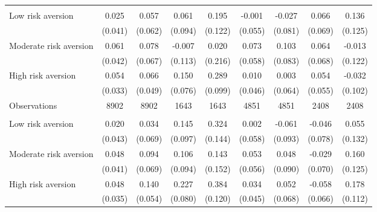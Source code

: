 {\begin{tabular}{l*{8}{c}}
\midrule
\addlinespace
\multicolumn{9}{l}{\textit{Panel B: Goods index}} \\
\addlinespace
Low risk aversion&    0.025         &    0.057         &    0.061         &    0.195         &   -0.001         &   -0.027         &    0.066         &    0.136         \\
                &  (0.041)         &  (0.062)         &  (0.094)         &  (0.122)         &  (0.055)         &  (0.081)         &  (0.069)         &  (0.125)         \\
\addlinespace
Moderate risk aversion&    0.061         &    0.078         &   -0.007         &    0.020         &    0.073         &    0.103         &    0.064         &   -0.013         \\
                &  (0.042)         &  (0.067)         &  (0.113)         &  (0.216)         &  (0.058)         &  (0.083)         &  (0.068)         &  (0.122)         \\
\addlinespace
High risk aversion&    0.054         &    0.066         &    0.150\sym{**} &    0.289\sym{***}&    0.010         &    0.003         &    0.054         &   -0.032         \\
                &  (0.033)         &  (0.049)         &  (0.076)         &  (0.099)         &  (0.046)         &  (0.064)         &  (0.055)         &  (0.102)         \\

\midrule
Observations    &     8902         &     8902         &     1643         &     1643         &     4851         &     4851         &     2408         &     2408         \\



\midrule
\addlinespace
\multicolumn{9}{l}{\textit{Panel C: Time index}} \\
\addlinespace
Low risk aversion&    0.020         &    0.034         &    0.145         &    0.324\sym{**} &    0.002         &   -0.061         &   -0.046         &    0.055         \\
                &  (0.043)         &  (0.069)         &  (0.097)         &  (0.144)         &  (0.058)         &  (0.093)         &  (0.078)         &  (0.132)         \\
\addlinespace
Moderate risk aversion&    0.048         &    0.094         &    0.106         &    0.143         &    0.053         &    0.048         &   -0.029         &    0.160         \\
                &  (0.041)         &  (0.069)         &  (0.094)         &  (0.152)         &  (0.056)         &  (0.090)         &  (0.070)         &  (0.125)         \\
\addlinespace
High risk aversion&    0.048         &    0.140\sym{**} &    0.227\sym{***}&    0.384\sym{***}&    0.034         &    0.052         &   -0.058         &    0.178         \\
                &  (0.035)         &  (0.054)         &  (0.080)         &  (0.120)         &  (0.045)         &  (0.068)         &  (0.066)         &  (0.112)         \\


\end{tabular}}
